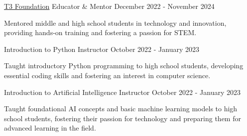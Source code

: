 

\begin{cventries}

\cventry
    {\href{https://www.t3vakfi.org/en/}{\underline{T3 Foundation}}} %
    {Educator \& Mentor} %
    {} %
    {December 2022 - November 2024} %
    {
      \begin{cvitems} %
        \item {Mentored middle and high school students in technology and innovation, providing hands-on training and fostering a passion for STEM.}
      \end{cvitems}
    }

\cventry
    {Introduction to Python} %
    {Instructor} %
    {} %
    {October 2022 - January 2023} %
    {
      \begin{cvitems} %
        \item {Taught introductory Python programming to high school students, developing essential coding skills and fostering an interest in computer science.}
      \end{cvitems}
    }


\cventry
    {Introduction to Artificial Intelligence} %
    {Instructor} %
    {} %
    {October 2022 - January 2023} %
    {
      \begin{cvitems} %
        \item {Taught foundational AI concepts and basic machine learning models to high school students, fostering their passion for technology and preparing them for advanced learning in the field.}
      \end{cvitems}
    }






\end{cventries}
